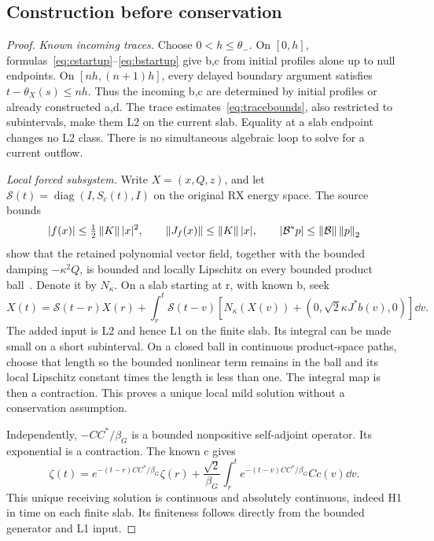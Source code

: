 \subsection{Construction before conservation}
\begin{proof}
\textit{Known incoming traces.}
Choose $0<h\le\theta_-$. On $[0,h]$, formulas~\eqref{eq:cstartup}--\eqref{eq:bstartup} give b,c from initial profiles alone up to null endpoints. On $[nh,(n+1)h]$, every delayed boundary argument satisfies $t-\theta_X(s)\le nh$. Thus the incoming b,c are determined by initial profiles or already constructed a,d. The trace estimates~\eqref{eq:tracebounds}, also restricted to subintervals, make them L2 on the current slab. Equality at a slab endpoint changes no L2 class. There is no simultaneous algebraic loop to solve for a current outflow.

\textit{Local forced subsystem.}
Write $X=(x,Q,z)$, and let $\mathcal S(t)=\operatorname{diag}(I,S_c(t),I)$ on the original RX energy space. The source bounds
\begin{equation}\label{eq:localLipschitz}
|f(x)|\le\tfrac12\left\lVert K\right\rVert|x|^2,\qquad
\left\lVert J_f(x)\right\rVert\le\left\lVert K\right\rVert|x|,\qquad
|\mathcal B^*p|\le\left\lVert\mathcal B\right\rVert\left\lVert p\right\rVert_2
\end{equation}
show that the retained polynomial vector field, together with the bounded damping $-\kappa^2Q$, is bounded and locally Lipschitz on every bounded product ball~\cite{RXwellposed}. Denote it by $N_\kappa$. On a slab starting at r, with known b, seek
\begin{equation}\label{eq:newduhamel}
X(t)=\mathcal S(t-r)X(r)+\int_r^t\mathcal S(t-v)
\left[N_\kappa(X(v))+(0,\sqrt2\kappa J^*b(v),0)\right]\dd v.
\end{equation}
The added input is L2 and hence L1 on the finite slab. Its integral can be made small on a short subinterval. On a closed ball in continuous product-space paths, choose that length so the bounded nonlinear term remains in the ball and its local Lipschitz constant times the length is less than one. The integral map is then a contraction. This proves a unique local mild solution without a conservation assumption.

Independently, $-CC^*/\beta_G$ is a bounded nonpositive self-adjoint operator. Its exponential is a contraction. The known c gives
\begin{equation}\label{eq:zetaVOC}
\zeta(t)=e^{-(t-r)CC^*/\beta_G}\zeta(r)
+\frac{\sqrt2}{\beta_G}\int_r^t e^{-(t-v)CC^*/\beta_G}Cc(v)\dd v.
\end{equation}
This unique receiving solution is continuous and absolutely continuous, indeed H1 in time on each finite slab. Its finiteness follows directly from the bounded generator and L1 input.


\end{proof}
